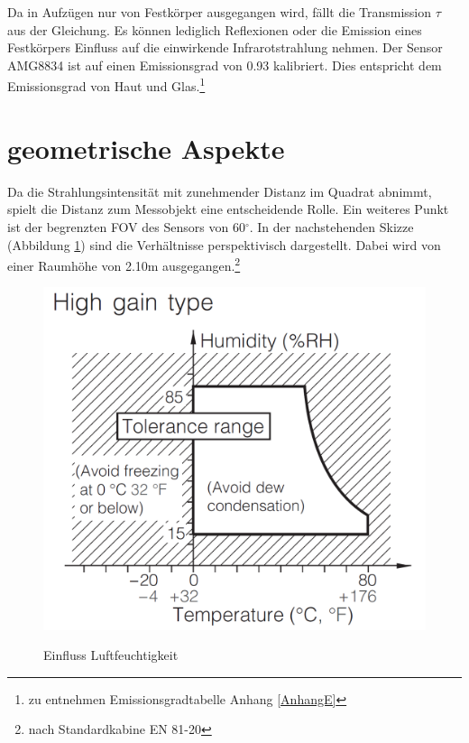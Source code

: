 Da in Aufzügen nur von Festkörper ausgegangen wird, fällt die Transmission $\tau$ aus der Gleichung. Es können lediglich Reflexionen oder die Emission eines Festkörpers Einfluss auf die einwirkende Infrarotstrahlung nehmen. Der Sensor AMG8834 ist auf einen Emissionsgrad von 0.93 kalibriert. Dies entspricht dem Emissionsgrad von Haut und Glas.\footnote[4]{ zu entnehmen Emissionsgradtabelle Anhang \ref{AnhangE}}

\section{geometrische Aspekte}
\label{sec:geometrie}

Da die Strahlungsintensität mit zunehmender Distanz im Quadrat abnimmt, spielt die Distanz zum Messobjekt eine entscheidende Rolle. Ein weiteres Punkt ist der begrenzten \ac{FOV} des Sensors von 60$^\circ$. In der nachstehenden Skizze (Abbildung \ref{fig:Geometrie}) sind die Verhältnisse perspektivisch dargestellt. Dabei wird von einer Raumhöhe von 2.10m ausgegangen.\footnote[5]{nach Standardkabine EN 81-20}  

\begin{figure}[H]
	\centering
	\includegraphics[width=1.0\textwidth]
	{fig/Humidity_Tolerance.PNG}
	\caption[Einfluss Luftfeuchtigkeit]{Einfluss Luftfeuchtigkeit} \protect\cite{AMG8834}
	\label{fig:Geometrie}
\end{figure}

